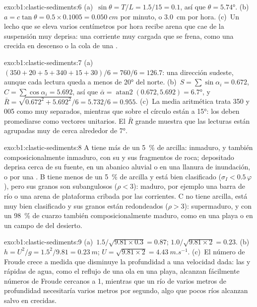 \begin{solution}{exo:b1:clastic-sediments:6}
(a)~$\sin\theta = T/L = 1.5/15 = 0.1$, así que $\theta = \ang{5.74}$. (b)~$a =
c\tan\theta = 0.5 \times 0.1005 = \qty{0.050}{cm}$ por minuto, o
\qty{3.0}{cm} por hora. (c)~Un lecho que se eleva varios centímetros por hora recibe arena que cae de la suspensión muy deprisa: una corriente muy cargada
que se frena, como una crecida en descenso o la cola de una .
\end{solution}

\begin{solution}{exo:b1:clastic-sediments:7}
(a)~$(350 + 20 + 5 + 340 + 15 + 30)/6 = 760/6 = 126.7$: una dirección sudeste, aunque cada lectura queda a menos de \ang{20} del norte. (b)~$S =
\sum\sin\alpha_i = 0.672$, $C = \sum\cos\alpha_i = 5.692$, así que $\bar\alpha =
\operatorname{atan2}(0.672, 5.692) = \ang{6.7}$, y $\bar R =
\sqrt{0.672^2 + 5.692^2}/6 = 5.732/6 = 0.955$. (c)~La media aritmética trata
350 y 005 como muy separados, mientras que sobre el círculo están a \ang{15}: los 
deben promediarse como vectores unitarios. El $\bar R$ grande muestra que las lecturas están
agrupadas muy de cerca alrededor de \ang{7}.
\end{solution}

\begin{solution}{exo:b1:clastic-sediments:8}
A tiene más de un \qty{5}{\percent} de arcilla: inmaduro, y también composicionalmente inmaduro, con su  y sus fragmentos de roca; depositado deprisa
cerca de su fuente, en un abanico aluvial o en una llanura de inundación, o por una . B tiene menos de un \qty{5}{\percent} de arcilla y
está bien clasificado ($\sigma_I < 0.5\,\varphi$), pero sus granos son subangulosos ($\rho < 3$): maduro, por ejemplo una barra de río o una arena de plataforma
cribada por las corrientes. C no tiene arcilla, está muy bien clasificado y sus granos están redondeados ($\rho > 3$): supermaduro, y con un \qty{98}{\percent} de cuarzo
también composicionalmente maduro, como en una playa o en un campo de  del desierto.
\end{solution}

\begin{solution}{exo:b1:clastic-sediments:9}
(a)~$1.5/\sqrt{9.81 \times 0.3} = 0.87$; $1.0/\sqrt{9.81 \times 2} = 0.23$.
(b)~$h = U^2/g = 1.5^2/9.81 = \qty{0.23}{m}$; $U = \sqrt{9.81 \times 2} =
\qty{4.43}{m.s^{-1}}$. (c)~El número de Froude crece a medida que disminuye la profundidad a una velocidad dada: las  y rápidas de agua, como el reflujo de una ola
en una playa, alcanzan fácilmente números de Froude cercanos a 1, mientras que un río de varios metros de profundidad necesitaría varios metros por segundo, algo que pocos ríos alcanzan
salvo en crecidas.
\end{solution}

